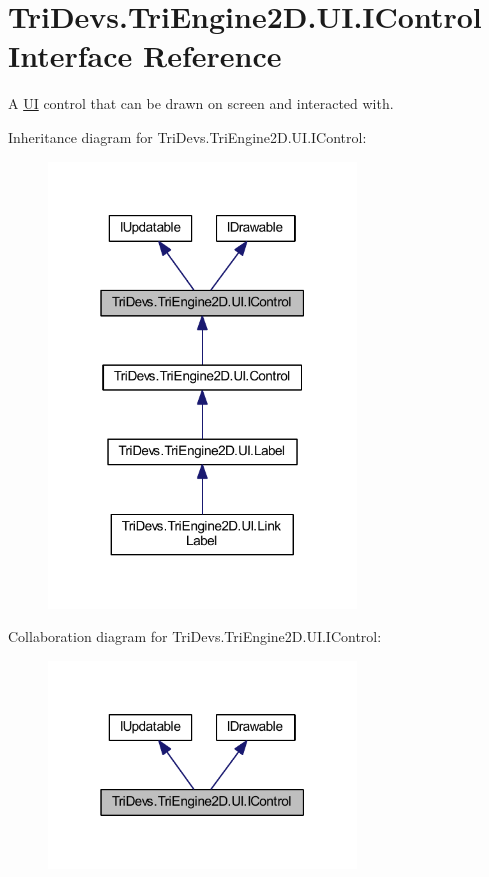 \hypertarget{interface_tri_devs_1_1_tri_engine2_d_1_1_u_i_1_1_i_control}{\section{Tri\-Devs.\-Tri\-Engine2\-D.\-U\-I.\-I\-Control Interface Reference}
\label{interface_tri_devs_1_1_tri_engine2_d_1_1_u_i_1_1_i_control}
}


A \hyperlink{namespace_tri_devs_1_1_tri_engine2_d_1_1_u_i}{U\-I} control that can be drawn on screen and interacted with.  




Inheritance diagram for Tri\-Devs.\-Tri\-Engine2\-D.\-U\-I.\-I\-Control\-:
\nopagebreak
\begin{figure}[H]
\begin{center}
\leavevmode
\includegraphics[width=232pt]{interface_tri_devs_1_1_tri_engine2_d_1_1_u_i_1_1_i_control__inherit__graph}
\end{center}
\end{figure}


Collaboration diagram for Tri\-Devs.\-Tri\-Engine2\-D.\-U\-I.\-I\-Control\-:
\nopagebreak
\begin{figure}[H]
\begin{center}
\leavevmode
\includegraphics[width=232pt]{interface_tri_devs_1_1_tri_engine2_d_1_1_u_i_1_1_i_control__coll__graph}
\end{center}
\end{figure}
